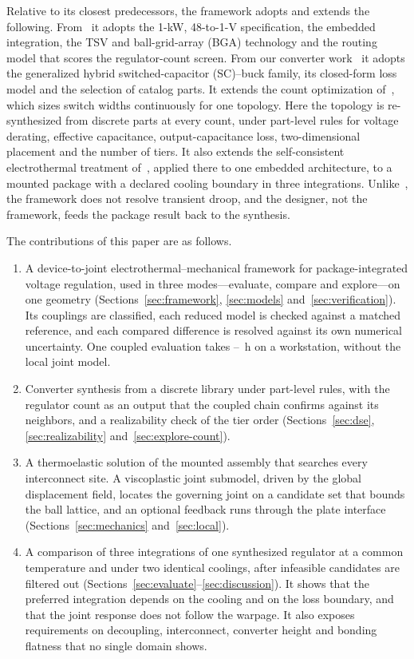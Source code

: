 

Relative to its closest predecessors, the framework adopts and extends
the following. From~\cite{Krishnakumar2026DVPD} it adopts the 1-kW, 48-to-1-V specification, the
embedded integration, the TSV and ball-grid-array (BGA) technology and the routing model that
scores the regulator-count screen. From our converter work~\cite{Abdelzaher2025ECTC,
Abdelzaher2026EPEPS} it adopts the generalized hybrid switched-capacitor (SC)--buck family, its
closed-form loss model and the selection of catalog parts. It extends the count optimization
of~\cite{Krishnakumar2026DVPD}, which sizes switch widths continuously for one topology. Here the
topology is re-synthesized from discrete parts at every count, under part-level rules for voltage
derating, effective capacitance, output-capacitance loss, two-dimensional placement and the number
of tiers. It also extends the self-consistent electrothermal treatment
of~\cite{Choi2025SelfConsistent}, applied there to one embedded architecture, to a mounted
package with a declared cooling boundary in three integrations. Unlike~\cite{Krishnakumar2026DVPD},
the framework does not resolve transient droop, and the designer, not the framework, feeds the
package result back to the synthesis.

The contributions of this paper are as follows.
\begin{enumerate}
\item A device-to-joint electrothermal--mechanical framework for package-integrated voltage
regulation, used in three modes---evaluate, compare and explore---on one geometry
(Sections~\ref{sec:framework}, \ref{sec:models} and~\ref{sec:verification}). Its couplings are
classified, each reduced model is checked against a matched reference, and each compared
difference is resolved against its own numerical uncertainty. One coupled evaluation takes
\MthTotHLo--\MthTotHHi~h on a workstation, without the local joint model.
\item Converter synthesis from a discrete library under part-level rules, with the regulator count
as an output that the coupled chain confirms against its neighbors, and a realizability check of
the tier order (Sections~\ref{sec:dse}, \ref{sec:realizability} and~\ref{sec:explore-count}).
\item A thermoelastic solution of the mounted assembly that searches every interconnect site. A
viscoplastic joint submodel, driven by the global displacement field, locates the governing joint
on a candidate set that bounds the ball lattice, and an optional feedback runs through the plate
interface (Sections~\ref{sec:mechanics} and~\ref{sec:local}).
\item A comparison of three integrations of one synthesized regulator at a common temperature and
under two identical coolings, after infeasible candidates are filtered out
(Sections~\ref{sec:evaluate}--\ref{sec:discussion}). It shows that the preferred integration
depends on the cooling and on the loss boundary, and that the joint response does not follow the
warpage. It also exposes requirements on decoupling, interconnect, converter height and bonding
flatness that no single domain shows.
\end{enumerate}

